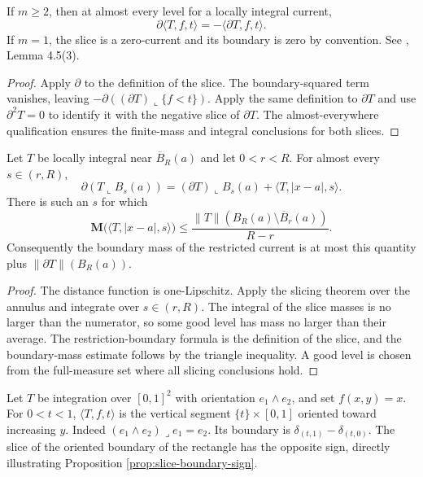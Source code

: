 \begin{proposition}\label{prop:slice-boundary-sign}
If $m\geq2$, then at almost every level for a locally integral current,
\[
 \partial\langle T,f,t\rangle=-\langle\partial T,f,t\rangle.
\]
If $m=1$, the slice is a zero-current and its boundary is zero by convention. See \cite{Sim18}, Lemma 4.5(3).
\end{proposition}
\begin{proof}
Apply $\partial$ to the definition of the slice. The boundary-squared term vanishes, leaving $-\partial((\partial T)\llcorner\{f<t\})$. Apply the same definition to $\partial T$ and use $\partial^2T=0$ to identify it with the negative slice of $\partial T$. The almost-everywhere qualification ensures the finite-mass and integral conclusions for both slices.
\end{proof}

\begin{proposition}\label{prop:current-good-radius}
Let $T$ be locally integral near $\overline B_R(a)$ and let $0<r<R$. For almost every $s\in(r,R)$,
\[
 \partial(T\llcorner B_s(a))
 =(\partial T)\llcorner B_s(a)+\langle T,|x-a|,s\rangle.
\]
There is such an $s$ for which
\[
 \mathbf M\bigl(\langle T,|x-a|,s\rangle\bigr)
 \leq\frac{\|T\|(B_R(a)\setminus\overline B_r(a))}{R-r}.
\]
Consequently the boundary mass of the restricted current is at most this quantity plus $\|\partial T\|(B_R(a))$.
\end{proposition}
\begin{proof}
The distance function is one-Lipschitz. Apply the slicing theorem over the annulus and integrate over $s\in(r,R)$. The integral of the slice masses is no larger than the numerator, so some good level has mass no larger than their average. The restriction-boundary formula is the definition of the slice, and the boundary-mass estimate follows by the triangle inequality. A good level is chosen from the full-measure set where all slicing conclusions hold.
\end{proof}

\begin{example}\label{ex:rectangle-slice}
Let $T$ be integration over $[0,1]^2$ with orientation $e_1\wedge e_2$, and set $f(x,y)=x$. For $0<t<1$, $\langle T,f,t\rangle$ is the vertical segment $\{t\}\times[0,1]$ oriented toward increasing $y$. Indeed $(e_1\wedge e_2)\mathbin{\lrcorner}e_1=e_2$. Its boundary is $\delta_{(t,1)}-\delta_{(t,0)}$. The slice of the oriented boundary of the rectangle has the opposite sign, directly illustrating Proposition \ref{prop:slice-boundary-sign}.
\end{example}

